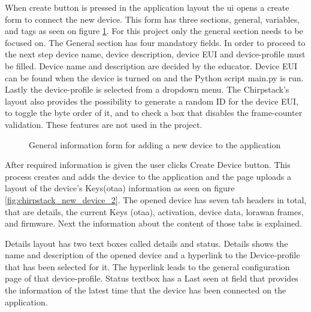 When create button is pressed in the application layout the \gls{ui} opens a create form to connect the new device.
This form has three sections, general, variables, and tags as seen on figure \ref{fig:chirpstack_new_device}.
For this project only the general section needs to be focused on.
The General section has four mandatory fields.
In order to proceed to the next step device name, device description, device EUI and device-profile must be filled.
Device name and description are decided by the educator.
Device EUI can be found when the device is turned on and the Python script main.py is run.
Lastly the device-profile is selected from a dropdown menu.
The Chirpstack's layout also provides the possibility to generate a random ID for the device EUI, to toggle the byte order of it, and to check a box that disables the frame-counter validation.
These features are not used in the project.

\begin{figure}[ht]
  \centering
  \caption{General information form for adding a new device to the application}
  \label{fig:chirpstack_new_device}
\end{figure}

After required information is given the user clicks Create Device button.
This process creates and adds the device to the application and the page uploads a layout of the device's Keys(\gls{otaa}) information as seen on figure \ref{fig:chirpstack_new_device_2}. 
The opened device has seven tab headers in total, that are details, the current Keys (\gls{otaa}), activation, device data, \gls{lorawan} frames, and firmware.
Next the information about the content of those tabs is explained.

Details layout has two text boxes called details and status.
Details shows the name and description of the opened device and a hyperlink to the Device-profile that has been selected for it.
The hyperlink leads to the general configuration page of that device-profile.
Status textbox has a Last seen at field that provides the information of the latest time that the device has been connected on the application.

